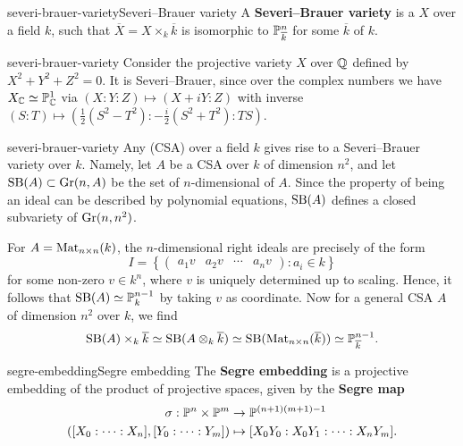         

\begin{topic}{severi-brauer-variety}{Severi--Brauer variety}
    A \textbf{Severi--Brauer variety} is a  $X$ over a field $k$, such that $\overline{X} = X \times_k \overline{k}$ is isomorphic to $\mathbb{P}^n_{\overline{k}}$ for some  $\overline{k}$ of $k$.
\end{topic}

\begin{example}{severi-brauer-variety}
    Consider the projective variety $X$ over $\mathbb{Q}$ defined by $X^2 + Y^2 + Z^2 = 0$. It is Severi--Brauer, since over the complex numbers we have $X_{\mathbb{C}} \simeq \mathbb{P}_{\mathbb{C}}^1$ via $(X : Y : Z) \mapsto (X + iY : Z)$ with inverse $(S : T) \mapsto (\tfrac{1}{2} (S^2 - T^2) : -\tfrac{i}{2} (S^2 + T^2) : TS)$.
\end{example}

\begin{example}{severi-brauer-variety}
    Any  (CSA) over a field $k$ gives rise to a Severi--Brauer variety over $k$. Namely, let $A$ be a CSA over $k$ of dimension $n^2$, and let $\textup{SB}(A) \subset \textup{Gr}(n, A)$ be the set of $n$-dimensional  of $A$. Since the property of being an ideal can be described by polynomial equations, $\textup{SB}(A)$ defines a closed subvariety of $\textup{Gr}(n, n^2)$.
    
    For $A = \textup{Mat}_{n \times n}(k)$, the $n$-dimensional right ideals are precisely of the form
    \[ I = \left\{ \begin{pmatrix} a_1 v & a_2 v & \cdots & a_n v \end{pmatrix} : a_i \in k \right\} \]
    for some non-zero $v \in k^n$, where $v$ is uniquely determined up to scaling. Hence, it follows that $\textup{SB}(A) \simeq \mathbb{P}^{n - 1}_k$ by taking $v$ as coordinate. Now for a general CSA $A$ of dimension $n^2$ over $k$, we find
    \[ \textup{SB}(A) \times_k \overline{k} \simeq \textup{SB}(A \otimes_k \overline{k}) \simeq \textup{SB}(\textup{Mat}_{n \times n}(\overline{k})) \simeq \mathbb{P}^{n - 1}_{\overline{k}} . \]
\end{example}

\begin{topic}{segre-embedding}{Segre embedding}
    The \textbf{Segre embedding} is a projective embedding of the product of projective spaces, given by the \textbf{Segre map}
    \[ \begin{aligned}
        \sigma : \mathbb{P}^n \times \mathbb{P}^m &\to \mathbb{P}^{(n + 1)(m + 1) - 1} \\
        ([X_0 : \cdots : X_n], [Y_0 : \cdots : Y_m]) &\mapsto [X_0 Y_0 : X_0 Y_1 : \cdots : X_n Y_m] .
    \end{aligned} \]
\end{topic}

